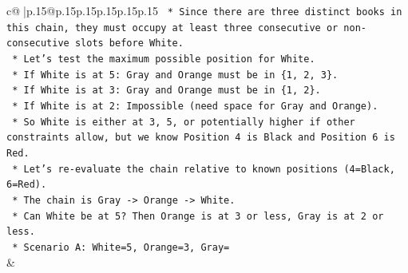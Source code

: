 \documentclass{article}
\begin{document}
{\begin{supertabular}{c@{$\;$}|p{.15\linewidth}@{}p{.15\linewidth}p{.15\linewidth}p{.15\linewidth}p{.15\linewidth}p{.15\linewidth}}
{{{\texttt{    *   Since there are three distinct books in this chain, they must occupy at least three consecutive or non{-}consecutive slots before White.} \\
\texttt{    *   Let's test the maximum possible position for White.} \\
\texttt{        *   If White is at 5: Gray and Orange must be in \{1, 2, 3\}.} \\
\texttt{        *   If White is at 3: Gray and Orange must be in \{1, 2\}.} \\
\texttt{        *   If White is at 2: Impossible (need space for Gray and Orange).} \\
\texttt{    *   So White is either at 3, 5, or potentially higher if other constraints allow, but we know Position 4 is Black and Position 6 is Red.} \\
\texttt{    *   Let's re{-}evaluate the chain relative to known positions (4=Black, 6=Red).} \\
\texttt{    *   The chain is Gray {-}> Orange {-}> White.} \\
\texttt{    *   Can White be at 5? Then Orange is at 3 or less, Gray is at 2 or less.} \\
\texttt{        *   Scenario A: White=5, Orange=3, Gray=} \\
            }
        }
    }
    & \\ \\


\end{supertabular}}
\end{document}
